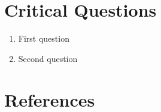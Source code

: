 \documentclass[oneside, notitlepage, twocolumn]{scrartcl}
\begin{document}
\section{Critical Questions}
\begin{enumerate}
    \item First question
    \item Second question
\end{enumerate}

\section{References}
\begingroup
\renewcommand{\section}[2]{}%
\nocite{*}
\printbibliography%
\endgroup
\end{document}
